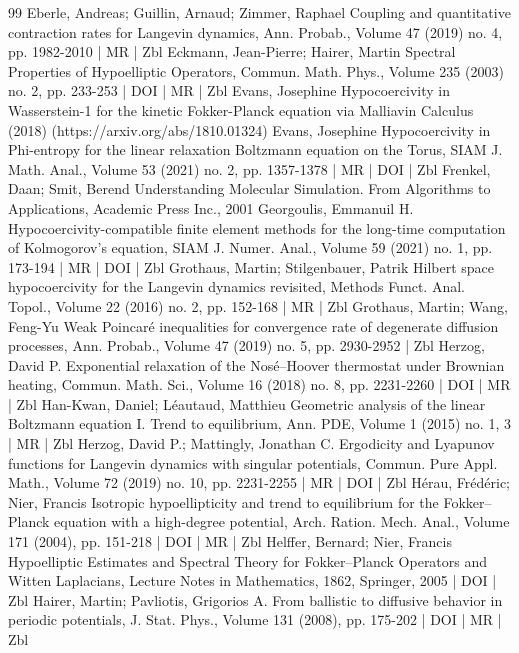 \begin{thebibliography}{99}
Eberle, Andreas; Guillin, Arnaud; Zimmer, Raphael Coupling and quantitative contraction rates for Langevin dynamics, Ann. Probab., Volume 47 (2019) no. 4, pp. 1982-2010 | MR | Zbl
Eckmann, Jean-Pierre; Hairer, Martin Spectral Properties of Hypoelliptic Operators, Commun. Math. Phys., Volume 235 (2003) no. 2, pp. 233-253 | DOI | MR | Zbl
Evans, Josephine Hypocoercivity in Wasserstein-1 for the kinetic Fokker-Planck equation via Malliavin Calculus (2018) (https://arxiv.org/abs/1810.01324)
Evans, Josephine Hypocoercivity in Phi-entropy for the linear relaxation Boltzmann equation on the Torus, SIAM J. Math. Anal., Volume 53 (2021) no. 2, pp. 1357-1378 | MR | DOI | Zbl
Frenkel, Daan; Smit, Berend Understanding Molecular Simulation. From Algorithms to Applications, Academic Press Inc., 2001
Georgoulis, Emmanuil H. Hypocoercivity-compatible finite element methods for the long-time computation of Kolmogorov’s equation, SIAM J. Numer. Anal., Volume 59 (2021) no. 1, pp. 173-194 | MR | DOI | Zbl
Grothaus, Martin; Stilgenbauer, Patrik Hilbert space hypocoercivity for the Langevin dynamics revisited, Methods Funct. Anal. Topol., Volume 22 (2016) no. 2, pp. 152-168 | MR | Zbl
Grothaus, Martin; Wang, Feng-Yu Weak Poincaré inequalities for convergence rate of degenerate diffusion processes, Ann. Probab., Volume 47 (2019) no. 5, pp. 2930-2952 | Zbl
Herzog, David P. Exponential relaxation of the Nosé–Hoover thermostat under Brownian heating, Commun. Math. Sci., Volume 16 (2018) no. 8, pp. 2231-2260 | DOI | MR | Zbl
Han-Kwan, Daniel; Léautaud, Matthieu Geometric analysis of the linear Boltzmann equation I. Trend to equilibrium, Ann. PDE, Volume 1 (2015) no. 1, 3 | MR | Zbl
Herzog, David P.; Mattingly, Jonathan C. Ergodicity and Lyapunov functions for Langevin dynamics with singular potentials, Commun. Pure Appl. Math., Volume 72 (2019) no. 10, pp. 2231-2255 | MR | DOI | Zbl
Hérau, Frédéric; Nier, Francis Isotropic hypoellipticity and trend to equilibrium for the Fokker–Planck equation with a high-degree potential, Arch. Ration. Mech. Anal., Volume 171 (2004), pp. 151-218 | DOI | MR | Zbl
Helffer, Bernard; Nier, Francis Hypoelliptic Estimates and Spectral Theory for Fokker–Planck Operators and Witten Laplacians, Lecture Notes in Mathematics, 1862, Springer, 2005 | DOI | Zbl
Hairer, Martin; Pavliotis, Grigorios A. From ballistic to diffusive behavior in periodic potentials, J. Stat. Phys., Volume 131 (2008), pp. 175-202 | DOI | MR | Zbl

\end{thebibliography}
